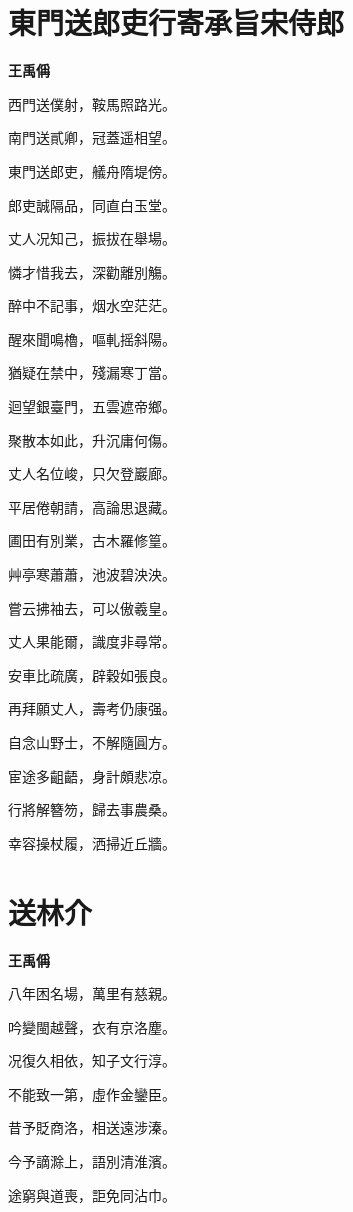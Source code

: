 \documentclass[12pt,a4paper]{ctexbook}
\begin{document}
\section{東門送郎吏行寄承旨宋侍郎}
\textbf{王禹偁}\par\vspace{0.5em}
西門送僕射，鞍馬照路光。\par
南門送貳卿，冠蓋遥相望。\par
東門送郎吏，艤舟隋堤傍。\par
郎吏誠隔品，同直白玉堂。\par
丈人况知己，振拔在舉場。\par
憐才惜我去，深勸離別觴。\par
醉中不記事，烟水空茫茫。\par
醒來聞鳴櫓，嘔軋摇斜陽。\par
猶疑在禁中，殘漏寒丁當。\par
迴望銀臺門，五雲遮帝鄉。\par
聚散本如此，升沉庸何傷。\par
丈人名位峻，只欠登巖廊。\par
平居倦朝請，高論思退藏。\par
圃田有別業，古木羅修篁。\par
艸亭寒蕭蕭，池波碧泱泱。\par
嘗云拂袖去，可以傲羲皇。\par
丈人果能爾，識度非尋常。\par
安車比疏廣，辟穀如張良。\par
再拜願丈人，壽考仍康强。\par
自念山野士，不解隨圓方。\par
宦途多齟齬，身計頗悲凉。\par
行將解簪笏，歸去事農桑。\par
幸容操杖履，洒掃近丘牆。\par

\section{送林介}
\textbf{王禹偁}\par\vspace{0.5em}
八年困名場，萬里有慈親。\par
吟變閩越聲，衣有京洛塵。\par
况復久相依，知子文行淳。\par
不能致一第，虛作金鑾臣。\par
昔予貶商洛，相送遠涉溱。\par
今予謫滁上，語別清淮濱。\par
途窮與道喪，詎免同沾巾。\par
\end{document}
